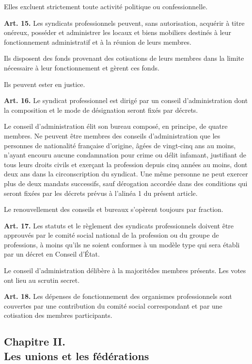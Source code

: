 \documentclass[french,twoside]{book} %
\newcommand{\labelchar}[1]{\textbf{\color{rubric} #1}}
\begin{document}
\noindent Elles excluent strictement toute activité politique ou confessionnelle.\par
\bigbreak
\noindent \labelchar{Art. 15.} Les syndicats professionnels peuvent, sans autorisation, acquérir à titre onéreux, posséder et administrer les locaux et biens mobiliers destinés à leur fonctionnement administratif et à la réunion de leurs membres.\par
Ils disposent des fonds provenant des cotisations de leurs membres dans la limite nécessaire à leur fonctionnement et gèrent ces fonds.\par
Ils peuvent ester en justice.\par
\bigbreak
\noindent \labelchar{Art. 16.} Le syndicat professionnel est dirigé par un conseil d’administration dont la composition et le mode de désignation seront fixés par décrets.\par
Le conseil d’administration élit son bureau composé, en principe, de quatre membres. Ne peuvent être membres des conseils d’administration que les personnes de nationalité française d’origine, âgées de vingt-cinq ans au moins, n’ayant encouru aucune condamnation pour crime ou délit infamant, justifiant de tous leurs droits civils et exerçant la profession depuis cinq années au moins, dont deux ans dans la circonscription du syndicat. Une même personne ne peut exercer plus de deux mandats successifs, sauf dérogation accordée dans des conditions qui seront fixées par les décrets prévus à l’alinéa 1 du présent article.\par
Le renouvellement des conseils et bureaux s’opèrent toujours par fraction.\par
\bigbreak
\noindent \labelchar{Art. 17.} Les statuts et le règlement des syndicats professionnels doivent être approuvés par le comité social national de la profession ou du groupe de professions, à moins qu’ils ne soient conformes à un modèle type qui sera établi par un décret en Conseil d’État.\par
Le conseil d’administration délibère à la majoritédes membres présents. Les votes ont lieu au scrutin secret.\par
\bigbreak
\noindent \labelchar{Art. 18.} Les dépenses de fonctionnement des organismes professionnels sont couvertes par une contribution du comité social correspondant et par une cotisation des membres participants.

\subsection[{Chapitre II. Les unions et les fédérations}]{Chapitre II. \\
Les unions et les fédérations}
\end{document}

